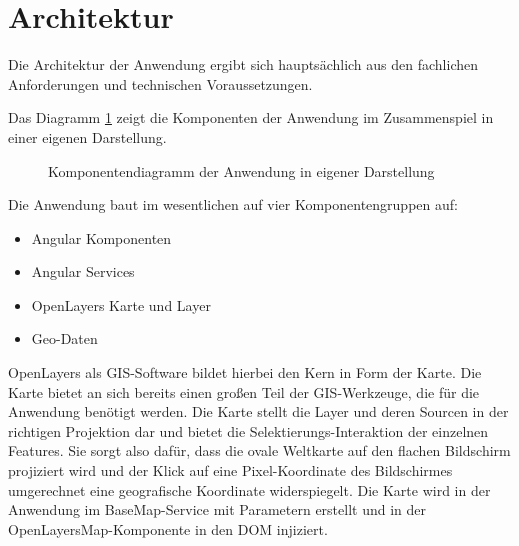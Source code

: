 \section{Architektur}
Die Architektur der Anwendung ergibt sich hauptsächlich aus den fachlichen Anforderungen und technischen Voraussetzungen. 

Das Diagramm \ref{img:components_diagram} zeigt die Komponenten der Anwendung im Zusammenspiel in einer eigenen Darstellung.

\begin{figure}[H]
	\caption{Komponentendiagramm der Anwendung in eigener Darstellung}
	\label{img:components_diagram}
\end{figure}

Die Anwendung baut im wesentlichen auf vier Komponentengruppen auf:

\begin{itemize}
\item Angular Komponenten
\item Angular Services
\item OpenLayers Karte und Layer
\item Geo-Daten
\end{itemize}

OpenLayers als GIS-Software bildet hierbei den Kern in Form der Karte.
Die Karte bietet an sich bereits einen großen Teil der GIS-Werkzeuge, die für die Anwendung benötigt werden.
Die Karte stellt die Layer und deren Sourcen in der richtigen Projektion dar und bietet die Selektierungs-Interaktion der einzelnen Features.
Sie sorgt also dafür, dass die ovale Weltkarte auf den flachen Bildschirm projiziert wird und der Klick auf eine Pixel-Koordinate des Bildschirmes umgerechnet eine geografische Koordinate widerspiegelt.
Die Karte wird in der Anwendung im BaseMap-Service mit Parametern erstellt und in der OpenLayersMap-Komponente in den DOM injiziert. 

